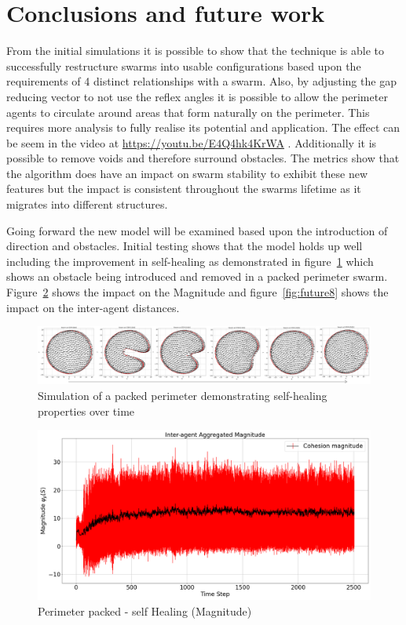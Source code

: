 \documentclass[12pt,a4paper]{IEEEtran}
\begin{document}
\section{Conclusions and future work}\label{conclusions}
From the initial simulations it is possible to show that the technique is able to successfully restructure swarms into usable configurations based upon the requirements of 4 distinct relationships with a swarm. Also, by adjusting the gap reducing vector to not use the reflex angles it is possible to allow the perimeter agents to circulate around areas that form naturally on the perimeter. This requires more analysis to fully realise its potential and application. The effect can be seem in the video at \url{https://youtu.be/E4Q4hk4KrWA} . Additionally it is possible to remove voids and therefore surround obstacles. The metrics show that the algorithm does have an impact on swarm stability to exhibit these new features but the impact is consistent throughout the swarms lifetime as it migrates into different structures.

Going forward the new model will be examined based upon the introduction of direction and obstacles. Initial testing shows that the model holds up well including the improvement in self-healing as demonstrated in figure~\ref{fig:packedSelfHealing} which shows an obstacle being introduced and removed in a packed perimeter swarm. Figure~\ref{fig:future7} shows the impact on the Magnitude and figure~\ref{fig:future8} shows the impact on the inter-agent distances.

\begin{figure}[!ht]
  \begin{center}
    \includegraphics[width=17.6cm]{figures/FutureTime}
  \end{center}
  \caption{Simulation of a packed perimeter demonstrating self-healing properties over time\label{fig:packedSelfHealing}}
\end{figure}

\begin{figure}[H]
	\begin{center}
		\includegraphics[width=1.0\linewidth]{figures/Future7}
	\end{center}
	\caption{Perimeter packed - self Healing (Magnitude)\label{fig:future7}}
\end{figure}
\end{document}
